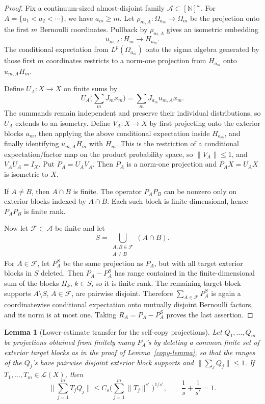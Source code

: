 \documentclass[11pt]{article}
\newtheorem{lemma}{Lemma}
\newcommand{\Lop}{\mathcal L}
\newcommand{\N}{\mathbb N}
\begin{document}
\begin{proof}
Fix a continuum-sized almost-disjoint family
\(\mathcal A\subset[\N]^\omega\).  For \(A=\{a_1<a_2<\cdots\}\), we have
\(a_m\ge m\).  Let
\(\rho_{m,A}:\Omega_{a_m}\to\Omega_m\) be the projection onto the first
\(m\) Bernoulli coordinates.  Pullback by \(\rho_{m,A}\) gives an isometric
embedding
\[
  u_{m,A}:H_m\longrightarrow H_{a_m}.
\]
The conditional expectation from \(L^p(\Omega_{a_m})\) onto the sigma algebra
generated by those first \(m\) coordinates restricts to a norm-one projection
from \(H_{a_m}\) onto \(u_{m,A}H_m\).

Define \(U_A:X\to X\) on finite sums by
\[
  U_A\Big(\sum_m J_m x_m\Big)=\sum_m J_{a_m}u_{m,A}x_m.
\]
The summands remain independent and preserve their individual distributions,
so \(U_A\) extends to an isometry.  Define \(V_A:X\to X\) by first projecting
onto the exterior blocks \(a_m\), then applying the above conditional
expectation inside \(H_{a_m}\), and finally identifying \(u_{m,A}H_m\) with
\(H_m\).  This is the restriction of a conditional expectation/factor map on
the product probability space, so \(\|V_A\|\le1\), and \(V_AU_A=I_X\).
Put \(P_A=U_AV_A\).  Then \(P_A\) is a norm-one projection and \(P_AX=U_AX\)
is isometric to \(X\).

If \(A\ne B\), then \(A\cap B\) is finite.  The operator \(P_AP_B\) can be
nonzero only on exterior blocks indexed by \(A\cap B\).  Each such block is
finite dimensional, hence \(P_AP_B\) is finite rank.

Now let \(\mathcal F\subset\mathcal A\) be finite and let
\[
  S=\bigcup_{\substack{A,B\in\mathcal F\\ A\ne B}} (A\cap B).
\]
For \(A\in\mathcal F\), let \(P_A^S\) be the same projection as \(P_A\), but
with all target exterior blocks in \(S\) deleted.  Then \(P_A-P_A^S\) has range
contained in the finite-dimensional sum of the blocks \(H_k\), \(k\in S\), so
it is finite rank.  The remaining target block supports \(A\setminus S\),
\(A\in\mathcal F\), are pairwise disjoint.  Therefore
\(\sum_{A\in\mathcal F}P_A^S\) is again a coordinatewise conditional
expectation onto mutually disjoint Bernoulli factors, and its norm is at most
one.  Taking \(R_A=P_A-P_A^S\) proves the last assertion.
\end{proof}

\begin{lemma}[Lower-estimate transfer for the self-copy projections]
\label{lower-lemma}
Let \(Q_1,\ldots,Q_m\) be projections obtained from finitely many \(P_A\)'s by
deleting a common finite set of exterior target blocks as in the proof of
Lemma~\ref{copy-lemma}, so that the ranges of the \(Q_j\)'s have pairwise
disjoint exterior block supports and \(\|\sum_j Q_j\|\le1\).  If
\(T_1,\ldots,T_m\in\Lop(X)\), then
\[
  \Big\|\sum_{j=1}^m T_jQ_j\Big\|
  \le C_s\Big(\sum_{j=1}^m \|T_j\|^{s'}\Big)^{1/s'},
  \qquad \frac1s+\frac1{s'}=1.
\]
\end{lemma}
\end{document}
